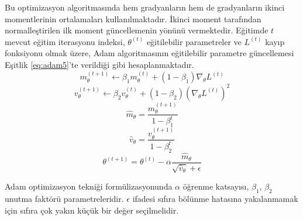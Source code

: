 Bu optimizasyon algoritmasında hem gradyanların hem de gradyanların ikinci momentlerinin ortalamaları kullanılmaktadır. İkinci moment tarafından normalleştirilen ilk moment güncellemenin yönünü vermektedir. Eğitimde $t$ mevcut eğitim iterasyonu indeksi, $\theta^{(t)}$ eğitilebilir parametreler ve $L^{(t)}$ kayıp fonksiyonu olmak üzere, Adam algoritmasının eğitilebilir parametre güncellemesi Eşitlik \ref{eq:adam5}'te verildiği gibi hesaplanmaktadır.
\begin{equation}
	\label{eq:adam1}
	m_{\theta}^{(t+1)} \leftarrow \beta_{1} m_{\theta}^{(t)}+\left(1-\beta_{1}\right) \nabla_{\theta} L^{(t)}
\end{equation}
\vspace{-1cm}
\begin{equation}
	\label{eq:adam2}
	v_{\theta}^{(t+1)} \leftarrow \beta_{2} v_{\theta}^{(t)}+\left(1-\beta_{2}\right) (\nabla_{\theta} L^{(t)})^{2}
\end{equation}
\vspace{-1cm}
\begin{equation}
	\label{eq:adam3}
	\hat{m}_{\theta}=\frac{m_{\theta}^{(t+1)}}{1-\beta_{1}^{t}}
\end{equation}
\vspace{-1cm}
\begin{equation}
	\label{eq:adam4}
	\hat{v}_{\theta}=\frac{v_{\theta}^{(t+1)}}{1-\beta_{2}^{t}}
\end{equation}
\vspace{-1cm}
\begin{equation}
	\label{eq:adam5}
	\theta^{(t+1)} = \theta^{(t)}-\alpha \frac{\hat{m}_{\theta}}{\sqrt{\hat{v}_{\theta}}+\epsilon}
\end{equation}

Adam optimizasyon tekniği formülizasyonunda $\alpha$ öğrenme katsayısı, $\beta_{1}$, $\beta_{2}$ unutma faktörü parametreleridir. $\epsilon$ ifadesi sıfıra bölünme hatasına yakalanmamak için sıfıra çok yakın küçük bir değer seçilmelidir.

